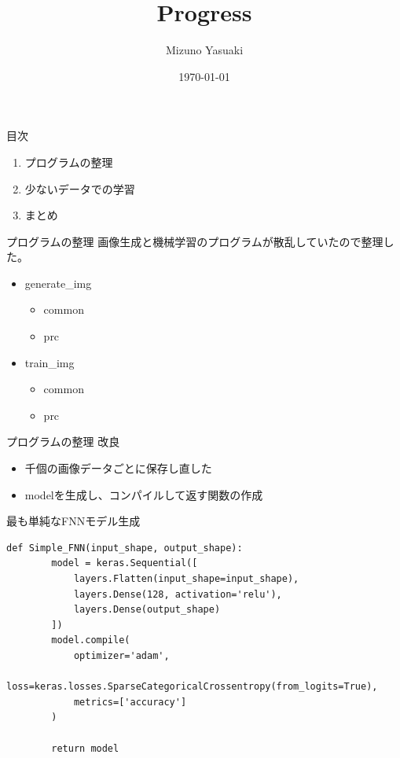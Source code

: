 \documentclass[uplatex, dvipdfmx]{beamer}
\title{Progress}
\date{\today}
\author{Mizuno Yasuaki}
\begin{document}
  \maketitle
  
  \begin{frame}{目次}
    \begin{enumerate}
      \item プログラムの整理
      \item 少ないデータでの学習
      \item まとめ
    \end{enumerate}
  \end{frame}

  \begin{frame}{プログラムの整理}
    画像生成と機械学習のプログラムが散乱していたので整理した。
    \begin{itemize}
      \item generate\_img
      \begin{itemize}
        \item common
        \item prc
      \end{itemize}
      \item train\_img
      \begin{itemize}
        \item common
        \item prc
      \end{itemize}
    \end{itemize}
  \end{frame}

  \begin{frame}{プログラムの整理}
    改良
    \begin{itemize}
      \item 千個の画像データごとに保存し直した
      \item modelを生成し、コンパイルして返す関数の作成
    \end{itemize}
  \end{frame}

  \begin{frame}[fragile]{最も単純なFNNモデル生成}
    \begin{lstlisting}[caption=Simple\_FNN.py]
      def Simple_FNN(input_shape, output_shape):
        model = keras.Sequential([
            layers.Flatten(input_shape=input_shape),
            layers.Dense(128, activation='relu'),
            layers.Dense(output_shape)
        ])
        model.compile(
            optimizer='adam',
            loss=keras.losses.SparseCategoricalCrossentropy(from_logits=True),
            metrics=['accuracy']
        )
    
        return model
    \end{lstlisting}
  \end{frame}
\end{document}
